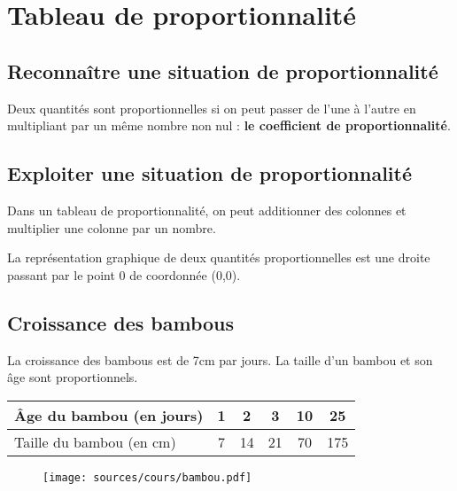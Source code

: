 \documentclass[paper=a4, fontsize=9pt]{scrartcl} %
\begin{document}
\section{Tableau de proportionnalité}
\begin{multicols}{2}
  \subsection{Reconnaître une situation de proportionnalité}

  \begin{Definition}
    Deux quantités sont proportionnelles si on peut passer de l'une à l'autre en multipliant par un même nombre non nul : \textbf{le coefficient de proportionnalité}.
  \end{Definition}

  \subsection{Exploiter une situation de proportionnalité}

  \begin{Proposition}
    Dans un tableau de proportionnalité, on peut additionner des colonnes et multiplier une colonne par un nombre.
  \end{Proposition}

  \begin{Proposition}
    La représentation graphique de deux quantités proportionnelles est une droite passant par le point 0 de coordonnée (0,0).
  \end{Proposition}

  \subsection{Croissance des bambous}

  La croissance des bambous est de 7cm par jours. La taille d'un bambou et son âge sont proportionnels.
  \begin{center}
    \begin{tabular}{| l || c | c | c | c | c |}
      \hline			
      Âge du bambou (en jours) & 1 &  2 &  3 & 10 &  25\\
      \hline  
      Taille du bambou (en cm) & 7 & 14 & 21 & 70 & 175\\
      \hline  
    \end{tabular}
  \end{center}

  \begin{figure}[H]
    \centering
    \texttt{[image: sources/cours/bambou.pdf]}
  \end{figure}
\end{multicols}
\end{document}
